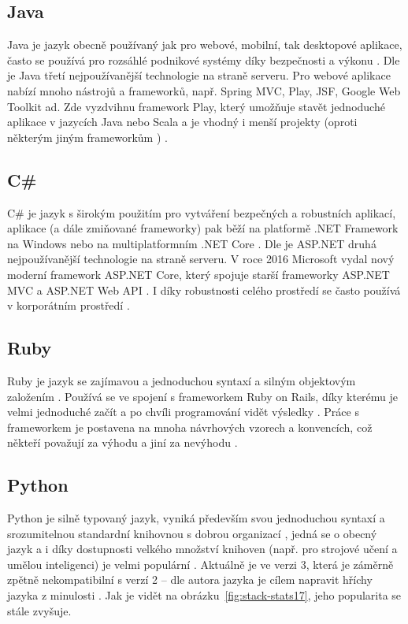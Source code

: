         \subsection{Java}
        Java je jazyk obecně používaný jak pro webové, mobilní, tak desktopové aplikace, často se používá pro rozsáhlé podnikové systémy díky bezpečnosti a výkonu \cite{tech2}. Dle \cite{tech-php1} je Java třetí nejpoužívanější technologie na straně serveru. Pro webové aplikace nabízí mnoho nástrojů a frameworků, např. Spring MVC, Play, JSF, Google Web Toolkit ad. Zde vyzdvihnu framework Play, který umožňuje stavět jednoduché aplikace v jazycích Java nebo Scala a je vhodný i menší projekty (oproti některým jiným frameworkům \cite{tech-java1}) \cite{tech-java2}.
        
        \subsection{C\#}
        C\# je jazyk s širokým použitím pro vytváření bezpečných a robustních aplikací, aplikace (a dále zmiňované frameworky) pak běží na platformě .NET Framework na Windows nebo na multiplatformním .NET Core \cite{tech-csharp1}. Dle \cite{tech-php1} je ASP.NET druhá nejpoužívanější technologie na straně serveru. V roce 2016 Microsoft vydal nový moderní framework ASP.NET Core, který spojuje starší frameworky ASP.NET MVC a ASP.NET Web API \cite{tech-csharp1}. I díky robustnosti celého prostředí se často používá v korporátním prostředí \cite{tech-csharp3}. 
        
        \subsection{Ruby}
        Ruby je jazyk se zajímavou a jednoduchou syntaxí a silným objektovým založením \cite{tech-ruby1}.
        Používá se ve spojení s frameworkem Ruby on Rails, díky kterému je velmi jednoduché začít a po chvíli programování vidět výsledky \cite{tech1}. Práce s frameworkem je postavena na mnoha návrhových vzorech a konvencích, což někteří považují za výhodu \cite{tech1} a jiní za nevýhodu \cite{tech-ruby2}.
        
        \subsection{Python}\label{sec:python}
        Python je silně typovaný jazyk, vyniká především svou jednoduchou syntaxí a srozumitelnou standardní knihovnou s dobrou organizací \cite{tech-python1}, jedná se o obecný jazyk a i díky dostupnosti velkého množství knihoven (např. pro strojové učení a umělou inteligenci) je velmi populární \cite{tech-python3}. Aktuálně je ve verzi 3, která je záměrně zpětně nekompatibilní s verzí 2 -- dle autora jazyka je cílem napravit hříchy jazyka z minulosti \cite{tech-python6}. Jak je vidět na obrázku~\ref{fig:stack-stats17}, jeho popularita se stále zvyšuje.
        
